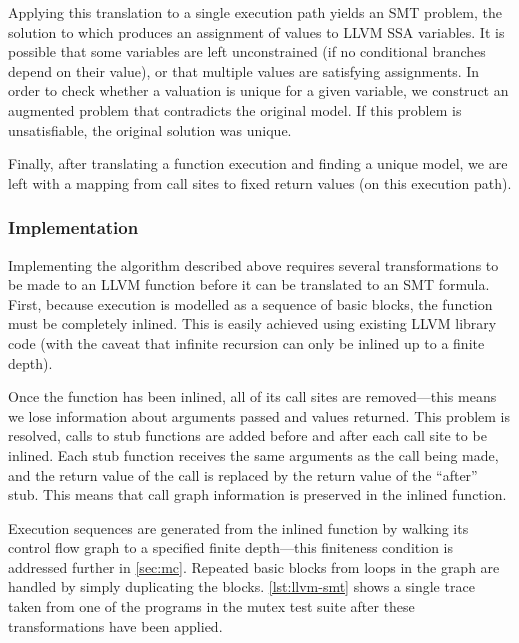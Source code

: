 Applying this translation to a single execution path yields an SMT problem, the
solution to which produces an assignment of values to LLVM SSA variables. It is
possible that some variables are left unconstrained (if no conditional branches
depend on their value), or that multiple values are satisfying assignments. In
order to check whether a valuation is unique for a given variable, we construct
an augmented problem that contradicts the original model. If this problem is
unsatisfiable, the original solution was unique.

Finally, after translating a function execution and finding a unique model, we
are left with a mapping from call sites to fixed return values (on this
execution path).

\subsubsection{Implementation}

Implementing the algorithm described above requires several transformations to
be made to an LLVM function before it can be translated to an SMT
formula. First, because execution is modelled as a sequence of basic
blocks, the function must be completely inlined. This is easily achieved using
existing LLVM library code (with the caveat that infinite recursion can only be
inlined up to a finite depth).

Once the function has been inlined, all of its call sites are removed---this
means we lose information about arguments passed and values returned. This
problem is resolved, calls to stub functions are added before and after each
call site to be inlined. Each stub function receives the same arguments as the
call being made, and the return value of the call is replaced by the return
value of the ``after'' stub. This means that call graph information is preserved
in the inlined function.

Execution sequences are generated from the inlined function by walking its
control flow graph to a specified finite depth---this finiteness condition is
addressed further in \autoref{sec:mc}. Repeated basic blocks from loops in the
graph are handled by simply duplicating the blocks. \autoref{lst:llvm-smt} shows
a single trace taken from one of the programs in the mutex test suite after
these transformations have been applied.


